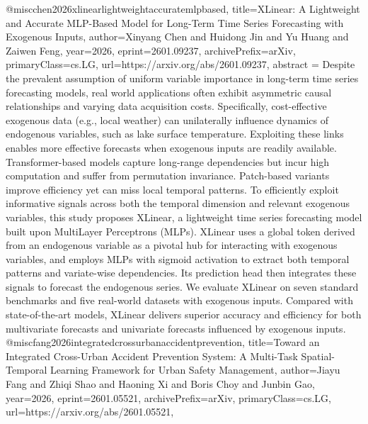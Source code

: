 {}@misc{chen2026xlinearlightweightaccuratemlpbased,
      title={XLinear: A Lightweight and Accurate MLP-Based Model for Long-Term Time Series Forecasting with Exogenous Inputs}, 
      author={Xinyang Chen and Huidong Jin and Yu Huang and Zaiwen Feng},
      year={2026},
      eprint={2601.09237},
      archivePrefix={arXiv},
      primaryClass={cs.LG},
      url={https://arxiv.org/abs/2601.09237},
      abstract = {Despite the prevalent assumption of uniform variable importance in long-term time series forecasting models, real world applications often exhibit asymmetric causal relationships and varying data acquisition costs. Specifically, cost-effective exogenous data (e.g., local weather) can unilaterally influence dynamics of endogenous variables, such as lake surface temperature. Exploiting these links enables more effective forecasts when exogenous inputs are readily available. Transformer-based models capture long-range dependencies but incur high computation and suffer from permutation invariance. Patch-based variants improve efficiency yet can miss local temporal patterns. To efficiently exploit informative signals across both the temporal dimension and relevant exogenous variables, this study proposes XLinear, a lightweight time series forecasting model built upon MultiLayer Perceptrons (MLPs). XLinear uses a global token derived from an endogenous variable as a pivotal hub for interacting with exogenous variables, and employs MLPs with sigmoid activation to extract both temporal patterns and variate-wise dependencies. Its prediction head then integrates these signals to forecast the endogenous series. We evaluate XLinear on seven standard benchmarks and five real-world datasets with exogenous inputs. Compared with state-of-the-art models, XLinear delivers superior accuracy and efficiency for both multivariate forecasts and univariate forecasts influenced by exogenous inputs.}
}@misc{fang2026integratedcrossurbanaccidentprevention,
      title={Toward an Integrated Cross-Urban Accident Prevention System: A Multi-Task Spatial-Temporal Learning Framework for Urban Safety Management}, 
      author={Jiayu Fang and Zhiqi Shao and Haoning Xi and Boris Choy and Junbin Gao},
      year={2026},
      eprint={2601.05521},
      archivePrefix={arXiv},
      primaryClass={cs.LG},
      url={https://arxiv.org/abs/2601.05521},
}
